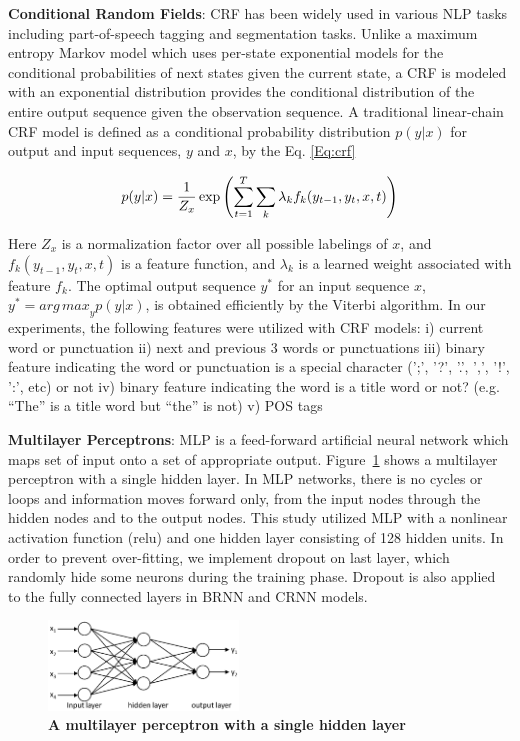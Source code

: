 \documentclass{amia}
\begin{document}
\textbf{Conditional Random Fields}: CRF has been widely used in various NLP tasks including part-of-speech tagging and segmentation tasks.\cite{lafferty2001conditional, hirohata2008identifying} Unlike a maximum entropy Markov model which uses per-state exponential models for the conditional probabilities of next states given the current state, a CRF is modeled with an exponential distribution provides the conditional distribution of the entire output sequence given the observation sequence. A traditional linear-chain CRF model is defined as a conditional probability distribution $p(y|x)$ for output and input sequences, $y$ and $x$, by the Eq. \ref{Eq:crf}

\begin{equation}
\label{Eq:crf}
p(y|x) = \frac{1}{Z_x}\exp{\left(\sum_{t=1}^{T}\sum_{k}^{}\lambda_k f_k(y_{t-1}, y_t, x, t)\right)} \\
\end{equation}

Here $Z_x$ is a normalization factor over all possible labelings of $x$, and $f_k(y_{t-1}, y_t, x, t)$ is a feature function, and $\lambda_k$ is a learned weight associated with feature $f_k$. The optimal output sequence $y^*$ for an input sequence $x$, $y^* = {arg\,max}_y p(y|x)$, is obtained efficiently by the Viterbi algorithm. In our experiments, the following features were utilized with CRF models: i) current word or punctuation ii) next and previous 3 words or punctuations iii) binary feature indicating the word or punctuation is a special character (';', '?', '.', ',', '!', ':', etc) or not iv) binary feature indicating the word is a title word or not? (e.g. ``The'' is a title word but ``the'' is not) v) POS tags   

\textbf{Multilayer Perceptrons}: MLP is a feed-forward artificial neural network which maps set of input onto a set of appropriate output.\cite{rumelhart1986learning} Figure~\ref{fig:mlp} shows a multilayer perceptron with a single hidden layer. In MLP networks, there is no cycles or loops and information moves forward only, from the input nodes through the hidden nodes and to the output nodes. This study utilized MLP with a nonlinear activation function (relu) and one hidden layer consisting of 128 hidden units. In order to prevent over-fitting, we implement dropout on last layer, which randomly hide some neurons during the training phase. \cite{srivastava2014dropout} Dropout is also applied to the fully connected layers in BRNN and CRNN models. 

\begin{figure}[!htb]
    \centering
    \includegraphics[width=0.45\textwidth]{figures/mlp.eps}
    \caption{\textbf{A multilayer perceptron with a single hidden layer}}
    \label{fig:mlp}
\end{figure}
\end{document}
